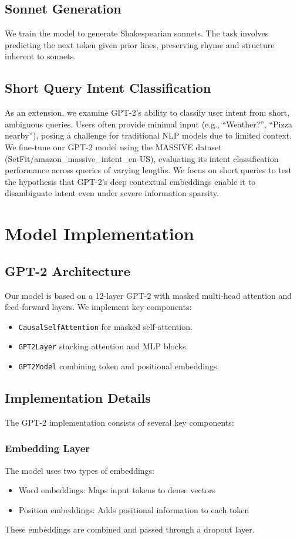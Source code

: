 \documentclass{article}
\begin{document}
\subsection{Sonnet Generation}
We train the model to generate Shakespearian sonnets. The task involves predicting the next token given prior lines, preserving rhyme and structure inherent to sonnets.

\subsection{Short Query Intent Classification}
As an extension, we examine GPT-2's ability to classify user intent from short, ambiguous queries. Users often provide minimal input (e.g., ``Weather?'', ``Pizza nearby''), posing a challenge for traditional NLP models due to limited context. We fine-tune our GPT-2 model using the MASSIVE dataset (SetFit/amazon\_massive\_intent\_en-US), evaluating its intent classification performance across queries of varying lengths. We focus on short queries to test the hypothesis that GPT-2's deep contextual embeddings enable it to disambiguate intent even under severe information sparsity.

\section{Model Implementation}
\subsection{GPT-2 Architecture}
Our model is based on a 12-layer GPT-2 with masked multi-head attention and feed-forward layers. We implement key components:
\begin{itemize}
\item \texttt{CausalSelfAttention} for masked self-attention.
\item \texttt{GPT2Layer} stacking attention and MLP blocks.
\item \texttt{GPT2Model} combining token and positional embeddings.
\end{itemize}

\subsection{Implementation Details}
The GPT-2 implementation consists of several key components:

\subsubsection{Embedding Layer}
The model uses two types of embeddings:
\begin{itemize}
\item Word embeddings: Maps input tokens to dense vectors
\item Position embeddings: Adds positional information to each token
\end{itemize}
These embeddings are combined and passed through a dropout layer.
\end{document}
